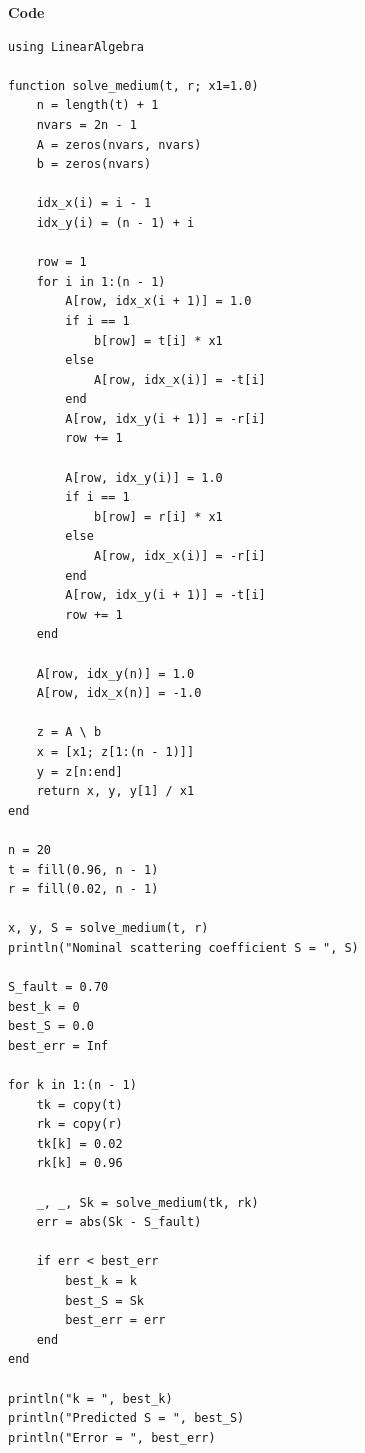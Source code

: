 \textbf{Code}

\begin{lstlisting}
using LinearAlgebra

function solve_medium(t, r; x1=1.0)
    n = length(t) + 1
    nvars = 2n - 1
    A = zeros(nvars, nvars)
    b = zeros(nvars)

    idx_x(i) = i - 1
    idx_y(i) = (n - 1) + i

    row = 1
    for i in 1:(n - 1)
        A[row, idx_x(i + 1)] = 1.0
        if i == 1
            b[row] = t[i] * x1
        else
            A[row, idx_x(i)] = -t[i]
        end
        A[row, idx_y(i + 1)] = -r[i]
        row += 1

        A[row, idx_y(i)] = 1.0
        if i == 1
            b[row] = r[i] * x1
        else
            A[row, idx_x(i)] = -r[i]
        end
        A[row, idx_y(i + 1)] = -t[i]
        row += 1
    end

    A[row, idx_y(n)] = 1.0
    A[row, idx_x(n)] = -1.0

    z = A \ b
    x = [x1; z[1:(n - 1)]]
    y = z[n:end]
    return x, y, y[1] / x1
end

n = 20
t = fill(0.96, n - 1)
r = fill(0.02, n - 1)

x, y, S = solve_medium(t, r)
println("Nominal scattering coefficient S = ", S)

S_fault = 0.70
best_k = 0
best_S = 0.0
best_err = Inf

for k in 1:(n - 1)
    tk = copy(t)
    rk = copy(r)
    tk[k] = 0.02
    rk[k] = 0.96

    _, _, Sk = solve_medium(tk, rk)
    err = abs(Sk - S_fault)

    if err < best_err
        best_k = k
        best_S = Sk
        best_err = err
    end
end

println("k = ", best_k)
println("Predicted S = ", best_S)
println("Error = ", best_err)
\end{lstlisting}
